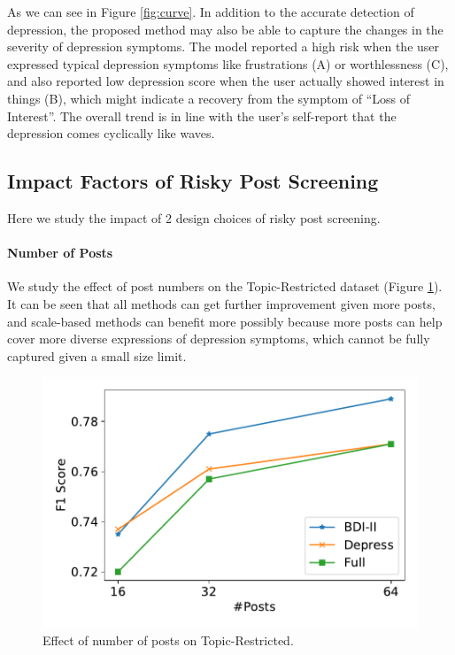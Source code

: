 As we can see in Figure \ref{fig:curve}. In addition to the accurate detection of depression, the proposed method may also be able to capture the changes in the severity of depression symptoms. The model reported a high risk when the user expressed typical depression symptoms like frustrations (A) or worthlessness (C), and also reported low depression score when the user actually showed interest in things (B), which might indicate a recovery from the symptom of ``Loss of Interest''. The overall trend is in line with the user's self-report that the depression comes cyclically like waves.

\subsection{Impact Factors of Risky Post Screening}
\label{sec:factor}

Here we study the impact of 2 design choices of risky post screening.

\paragraph{Number of Posts} 
We study the effect of post numbers on the Topic-Restricted dataset (Figure \ref{fig:post_numbers}). It can be seen that all methods can get further improvement given more posts, and scale-based methods can benefit more possibly because more posts can help cover more diverse expressions of depression symptoms, which cannot be fully captured given a small size limit.


\begin{figure}[h]
    \centering
    \includegraphics[width=0.88\columnwidth]{figures/post_numbers.pdf}
    \caption{Effect of number of posts on Topic-Restricted.}
    \label{fig:post_numbers}
\end{figure}

